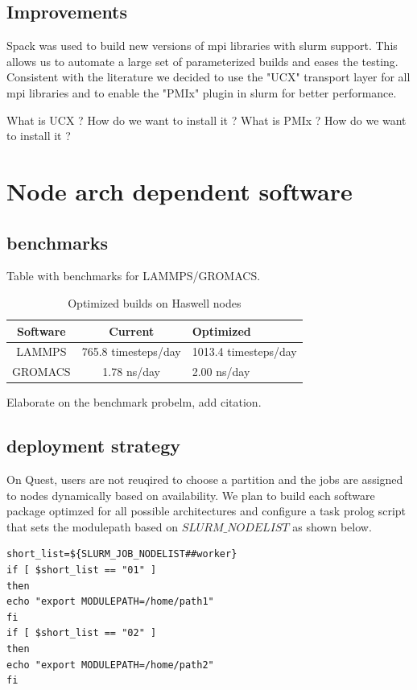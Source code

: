 \documentclass[sigconf,authordraft]{acmart}
\begin{document}
\subsection{Improvements}
 
Spack\cite{spack} was used to build new versions of mpi libraries with slurm support. This allows us to automate a large set of parameterized builds and eases the testing. Consistent with the literature we decided to use the "UCX" transport layer for all mpi libraries and to enable the "PMIx" plugin in slurm for better performance.

What is UCX ? How do we want to install it ?
What is PMIx ? How do we want to install it ?

\section{Node arch dependent software}

\subsection{benchmarks}
Table with benchmarks for LAMMPS/GROMACS.

\begin{table}
	\caption{Optimized builds on Haswell nodes}
	\label{tab:bench_apps}
	\begin{tabular}{ccl}
		\toprule
		Software &Current&Optimized\\
		\midrule
		LAMMPS & 765.8 timesteps/day&1013.4 timesteps/day\\
		GROMACS & 1.78 ns/day&2.00 ns/day\\
		\bottomrule
	\end{tabular}
\end{table}
 
Elaborate on the benchmark probelm, add citation.


\subsection{deployment strategy}
On Quest, users are not reuqired to choose a partition and the jobs are assigned to nodes dynamically based on availability. We plan to build each software package optimzed for all possible architectures and configure a task prolog script that sets the modulepath based on $SLURM\_NODELIST$ as shown below.

\begin{verbatim}
short_list=${SLURM_JOB_NODELIST##worker}
if [ $short_list == "01" ]
then
echo "export MODULEPATH=/home/path1"
fi
if [ $short_list == "02" ]
then
echo "export MODULEPATH=/home/path2"
fi
\end{verbatim}
\end{document}

